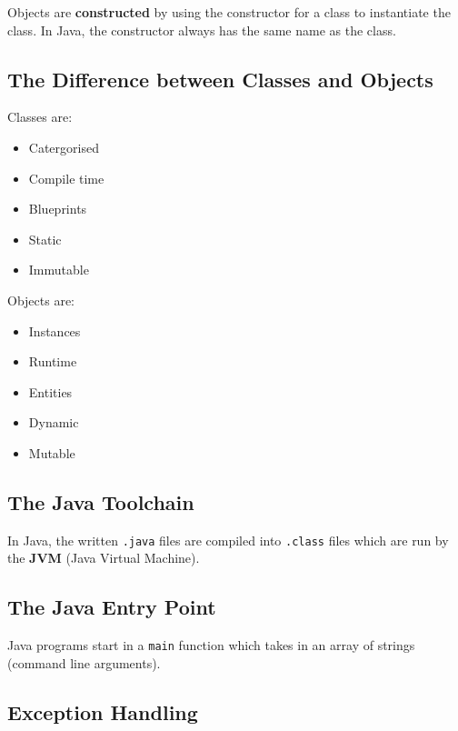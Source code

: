 \documentclass[a4paper, 12pt, twoside]{article}
\begin{document}
\vspace{\baselineskip}

Objects are \textbf{constructed} by using the constructor for a class
to instantiate the class. In Java, the constructor always has the
same name as the class.

\newpage

\subsection{The Difference between Classes and Objects}

\begin{multicols}{2}
    Classes are:
    \begin{itemize}
        \item Catergorised
        \item Compile time
        \item Blueprints
        \item Static
        \item Immutable
    \end{itemize}
    \columnbreak
    Objects are:
    \begin{itemize}
        \item Instances
        \item Runtime
        \item Entities
        \item Dynamic
        \item Mutable
    \end{itemize}
\end{multicols}

\subsection{The Java Toolchain}

In Java, the written \texttt{.java} files are compiled into 
\texttt{.class} files which are run by the \textbf{JVM} (Java
Virtual Machine).

\subsection{The Java Entry Point}

Java programs start in a \texttt{main} function which takes in
an array of strings (command line arguments).

\subsection{Exception Handling}
\end{document}
